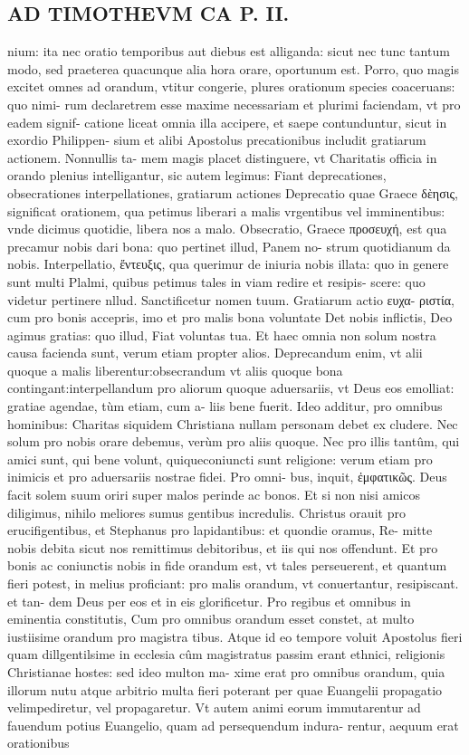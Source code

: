 \documentclass{article}
\begin{document}
\begin{pages}
\section*{AD TIMOTHEVM CA P. II. }
\marginpar{[ p.55 ]}\pstart nium: ita nec oratio temporibus aut diebus  est alliganda: sicut nec tunc tantum modo, sed praeterea quacunque alia hora orare, oportunum est. Porro, quo magis excitet omnes ad orandum, vtitur congerie, plures orationum species coaceruans: quo nimi- rum declaretrem esse maxime necessariam et plurimi faciendam, vt pro eadem signif- catione liceat omnia illa accipere, et saepe contunduntur, sicut in exordio Philippen- sium et alibi Apostolus precationibus includit gratiarum actionem. Nonnullis ta- mem magis placet distinguere, vt Charitatis officia in orando plenius intelligantur, sic autem legimus: Fiant deprecationes, obsecrationes interpellationes, gratiarum actiones Deprecatio quae Graece δὲησις, significat orationem, qua petimus liberari a malis vrgentibus vel imminentibus: vnde dicimus quotidie, libera nos a malo. Obsecratio, Graece προσευχή, est qua precamur nobis dari bona: quo pertinet illud, Panem no- strum quotidianum da nobis. Interpellatio, ἔντευξις, qua querimur de iniuria nobis illata: quo in genere sunt multi Plalmi, quibus petimus tales in viam redire et resipis- scere: quo videtur pertinere nllud. Sanctificetur nomen tuum. Gratiarum actio ευχα- ριστία, cum pro bonis accepris, imo et pro malis bona voluntate Det nobis inflictis, Deo agimus gratias: quo illud, Fiat voluntas tua. Et haec omnia non solum nostra causa facienda sunt, verum etiam propter alios. Deprecandum enim, vt alii quoque a malis liberentur:obsecrandum vt aliis quoque bona contingant:interpellandum pro aliorum quoque aduersariis, vt Deus eos emolliat: gratiae agendae, tùm etiam, cum a- liis bene fuerit. Ideo additur, pro omnibus hominibus: Charitas siquidem Christiana nullam personam debet ex cludere. Nec solum pro nobis orare debemus, verùm pro aliis quoque. Nec pro illis tantûm, qui amici sunt, qui bene volunt, quiqueconiuncti sunt religione: verum etiam pro inimicis et pro aduersariis nostrae fidei. Pro omni- bus, inquit, ἐμφατικῶς. Deus facit solem suum oriri super malos perinde ac bonos. Et si non nisi amicos diligimus, nihilo meliores sumus gentibus incredulis. Christus orauit pro erucifigentibus, et Stephanus pro lapidantibus: et quondie oramus, Re- mitte nobis debita sicut nos remittimus debitoribus, et iis qui nos offendunt. Et pro bonis ac coniunctis nobis in fide orandum est, vt tales perseuerent, et quantum fieri potest, in melius proficiant: pro malis orandum, vt conuertantur, resipiscant. et tan- dem Deus per eos et in eis glorificetur. Pro regibus et omnibus in eminentia constitutis, Cum pro omnibus orandum esset constet, at multo iustiisime orandum pro magistra tibus. Atque id eo tempore voluit Apostolus fieri quam dillgentilsime in ecclesia cûm magistratus passim erant ethnici, religionis Christianae hostes: sed ideo multon ma- xime erat pro omnibus orandum, quia illorum nutu atque arbitrio multa fieri poterant per quae Euangelii propagatio velimpediretur, vel propagaretur. Vt autem animi eorum immutarentur ad fauendum potius Euangelio, quam ad persequendum indura- rentur, aequum erat orationibus 
\end{pages}
\end{document}
